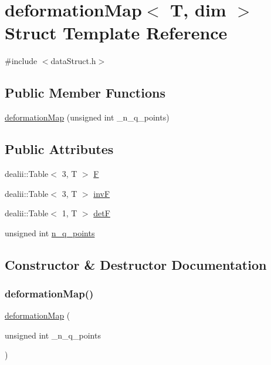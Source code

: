 \section{deformation\+Map$<$ T, dim $>$ Struct Template Reference}
\label{structdeformation_map}


{\ttfamily \#include $<$data\+Struct.\+h$>$}

\subsection*{Public Member Functions}
\begin{DoxyCompactItemize}
\item 
\mbox{\hyperlink{structdeformation_map_a3ce85c3a09b45f207030b97eed6c5e4c}{deformation\+Map}} (unsigned int \+\_\+n\+\_\+q\+\_\+points)
\end{DoxyCompactItemize}
\subsection*{Public Attributes}
\begin{DoxyCompactItemize}
\item 
dealii\+::\+Table$<$ 3, T $>$ \mbox{\hyperlink{structdeformation_map_a7934bed7ba72b5e4a3af1fd8a4e14198}{F}}
\item 
dealii\+::\+Table$<$ 3, T $>$ \mbox{\hyperlink{structdeformation_map_ae40deb9e4616ec6d0b77519e56646ce0}{invF}}
\item 
dealii\+::\+Table$<$ 1, T $>$ \mbox{\hyperlink{structdeformation_map_aa1ff2dc8fb6f4f6e9125ca026505a977}{detF}}
\item 
unsigned int \mbox{\hyperlink{structdeformation_map_a75df8197cf561419d8ead67373abeafd}{n\+\_\+q\+\_\+points}}
\end{DoxyCompactItemize}


\subsection{Constructor \& Destructor Documentation}
\mbox{\label{structdeformation_map_a3ce85c3a09b45f207030b97eed6c5e4c}} 
\subsubsection{\texorpdfstring{deformationMap()}{deformationMap()}}
{\footnotesize\ttfamily \mbox{\hyperlink{structdeformation_map}{deformation\+Map}} (\begin{DoxyParamCaption}\item[{unsigned int}]{\+\_\+n\+\_\+q\+\_\+points }\end{DoxyParamCaption})\hspace{0.3cm}{\ttfamily [inline]}}



